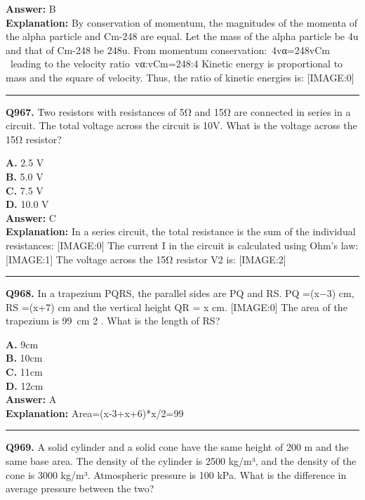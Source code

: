 \documentclass[12pt]{article}
\begin{document}
\textbf{Answer:} B \\
\textbf{Explanation:} By conservation of momentum, the magnitudes of the momenta of the alpha particle and Cm-248 are equal. Let the mass of the alpha particle be 4u and that of Cm-248 be 248u. From momentum conservation: 4vα=248vCm  leading to the velocity ratio vα:vCm=248:4 Kinetic energy is proportional to mass and the square of velocity. Thus, the ratio of kinetic energies is:
[IMAGE:0]

\hrule
\vspace{1em}


\noindent
\textbf{Q967.} Two resistors with resistances of 5Ω and 15Ω are connected in series in a circuit. The total voltage across the circuit is 10V. What is the voltage across the 15Ω resistor?



\textbf{A.} 2.5 V \\
\textbf{B.} 5.0 V \\
\textbf{C.} 7.5 V \\
\textbf{D.} 10.0 V \\

\textbf{Answer:} C \\
\textbf{Explanation:} In a series circuit, the total resistance is the sum of the individual resistances:
[IMAGE:0]
The current
I
in the circuit is calculated using Ohm's law:
[IMAGE:1]
The voltage across the 15Ω resistor V2​ is:
[IMAGE:2]

\hrule
\vspace{1em}


\noindent
\textbf{Q968.} In a trapezium PQRS, the parallel sides are PQ and RS. PQ =(x−3) cm, RS =(x+7) cm and the vertical height QR = x cm.
[IMAGE:0]
The area of the trapezium is 99 cm
2
. What is the length of RS?



\textbf{A.} 9cm \\
\textbf{B.} 10cm \\
\textbf{C.} 11cm \\
\textbf{D.} 12cm \\

\textbf{Answer:} A \\
\textbf{Explanation:} Area=(x-3+x+6)*x/2=99

\hrule
\vspace{1em}


\noindent
\textbf{Q969.} A solid cylinder and a solid cone have the same height of 200 m and the same base area. The density of the cylinder is 2500 kg/m³, and the density of the cone is 3000 kg/m³. Atmospheric pressure is 100 kPa. What is the difference in average pressure between the two?
\end{document}
